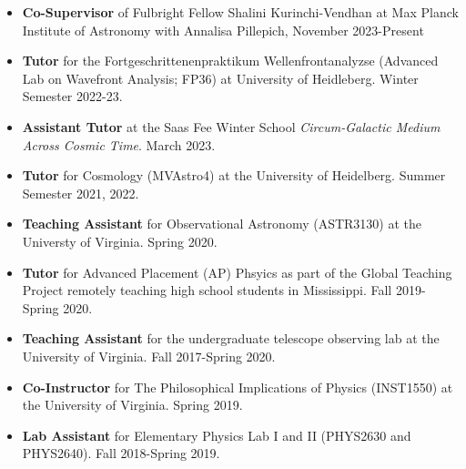 \documentclass[a4paper,10pt,oneside]{article}
\begin{document}
\noindent{}

\begin{itemize}[wide, labelwidth=!, labelindent=-11pt, parsep=0pt]
    \item {\bf Co-Supervisor} of Fulbright Fellow Shalini Kurinchi-Vendhan at Max Planck Institute of Astronomy with Annalisa Pillepich, November 2023-Present
    \item {\bf Tutor} for the Fortgeschrittenenpraktikum Wellenfrontanalyzse (Advanced Lab on Wavefront Analysis; FP36) at University of Heidleberg. Winter Semester 2022-23.
    \item {\bf Assistant Tutor} at the Saas Fee Winter School {\it Circum-Galactic Medium Across Cosmic Time}. March 2023. 
    \item {\bf Tutor} for Cosmology (MVAstro4) at the University of Heidelberg. Summer Semester 2021, 2022.
    \item {\bf Teaching Assistant} for Observational Astronomy (ASTR3130) at the Universty of Virginia. Spring 2020.
    \item {\bf Tutor} for Advanced Placement (AP) Phsyics as part of the Global Teaching Project remotely teaching high school students in Mississippi. Fall 2019-Spring 2020.
    \item {\bf Teaching Assistant} for the undergraduate telescope observing lab at the University of Virginia. Fall 2017-Spring 2020. 
    \item {\bf Co-Instructor} for The Philosophical Implications of Physics (INST1550) at the University of Virginia. Spring 2019.
    \item {\bf Lab Assistant} for Elementary Physics Lab I and II (PHYS2630 and PHYS2640). Fall 2018-Spring 2019. 
\end{itemize}

\noindent{}
\end{document}
